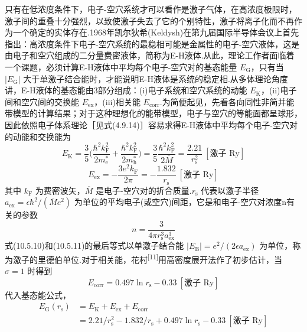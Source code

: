 只有在低浓度条件下，电子-空穴系统才可以看作是激子气体，在高浓度极限时，激子间的重叠十分强烈，以致使激子失去了它的个别特性，激子将离子化而不再作为一个确定的实体存在.1968年凯尔狄希(Keldysh)在第九届国际半导体会议上首先指出：高浓度条件下电子-空穴系统的最稳相可能是金属性的电子-空穴液体，这是由电子和空穴组成的二分量费密液体，简称为E-H液体.从此，理论工作者面临着一个课题，必须计算E-H液体中平均每个电子-空穴对的基态能量 $E_{\mathrm{G}}$，只有当 $|E_{\mathrm{G}}|$ 大于单激子结合能时，才能说明E-H液体是系统的稳定相.从多体理论角度讲，E-H液体的基态能由3部分组成：(i)电子系统和空穴系统的动能 $E_{\mathrm{K}}$，(ii)电子间和空穴间的交换能 $E_{\mathrm{ex}}$，(iii)相关能 $E_{\mathrm{corr}}$.为简便起见，先看各向同性非简并能带模型的计算结果；对于这种理想化的能带模型，电子与空穴的等能面都呈球形，因此依照电子体系理论［见式(4.9.14)］容易求得E-H液体中平均每个电子-空穴对的动能和交换能为
\begin{equation}
  E_{\mathrm{K}}=\frac{3}{5}\biggl(\frac{\hbar^{2}k_{\mathrm{F}}^{2}}{2m_{\mathrm{e}}^{*}}
  +\frac{\hbar^{2}k_{\mathrm{F}}^{2}}{2m_{\mathrm{h}}^{*}}\biggr)
  =\frac{3}{5}\frac{\hbar^{2}k_{\mathrm{F}}^{2}}{2\overline{M}}
  =\frac{2.21}{r_{\mathrm{s}}^{2}}\ [\text{激子 Ry}]
\end{equation}
\begin{equation}
  E_{\mathrm{ex}}=-\frac{3e^{2}k_{\mathrm{F}}}{2\pi}
  =-\frac{1.832}{r_{\mathrm{s}}}\ [\text{激子 Ry}]
\end{equation}
其中 $k_{\mathrm{F}}$ 为费密波矢，$\overline{M}$ 是电子-空穴对的折合质量.$r_{\mathrm{s}}$ 代表以激子半径 $a_{\mathrm{ex}}=\epsilon\hbar^{2}/(\overline{M}e^{2})$ 为单位的平均电子(或空穴)间距，它是和电子-空穴对浓度n有关的参数
\begin{equation}
  n=\frac{3}{4\pi r_{\mathrm{s}}^{3}a_{\mathrm{ex}}^{3}}
\end{equation}
式(10.5.10)和(10.5.11)的最后等式以单激子结合能 $|E_{\mathrm{B}}|=e^{2}/(2\epsilon a_{\mathrm{ex}})$ 为单位，称为激子的里德伯单位.对于相关能，花村\textsuperscript{[11]}用高密度展开法作了初步估计，当 $\sigma=1$ 时得到
\begin{equation}
  E_{\mathrm{corr}}=0.497\ln r_{\mathrm{s}}-0.33\ [\text{激子 Ry}]
\end{equation}
代入基态能公式，
\begin{equation}
\begin{aligned}
  E_{\mathrm{G}}\left(r_{\mathrm{s}}\right)&=E_{\mathrm{K}}+E_{\mathrm{ex}}+E_{\mathrm{corr}}\\
  &=2.21/r_{\mathrm{s}}^{2}-1.832/r_{\mathrm{s}}+0.497\ln r_{\mathrm{s}}-0.33\ [\text{激子 Ry}]
\end{aligned}
\end{equation}
